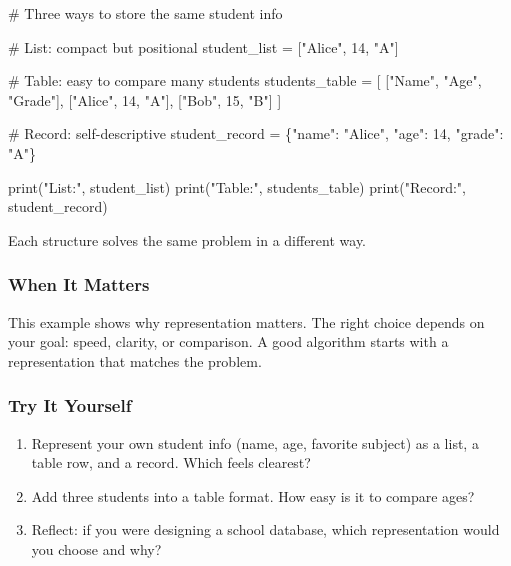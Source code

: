 \documentclass[
  letterpaper,
  DIV=11,
  numbers=noendperiod]{scrreprt}
\newenvironment{Shaded}{\begin{snugshade}}{\end{snugshade}}
\newcommand{\BuiltInTok}[1]{\textcolor[rgb]{0.00,0.23,0.31}{#1}}
\newcommand{\CommentTok}[1]{\textcolor[rgb]{0.37,0.37,0.37}{#1}}
\newcommand{\DecValTok}[1]{\textcolor[rgb]{0.68,0.00,0.00}{#1}}
\newcommand{\NormalTok}[1]{\textcolor[rgb]{0.00,0.23,0.31}{#1}}
\newcommand{\OperatorTok}[1]{\textcolor[rgb]{0.37,0.37,0.37}{#1}}
\newcommand{\StringTok}[1]{\textcolor[rgb]{0.13,0.47,0.30}{#1}}
\providecommand{\tightlist}{%
  \setlength{\itemsep}{0pt}\setlength{\parskip}{0pt}}
\begin{document}
\begin{Shaded}
\begin{Highlighting}[]
\CommentTok{\# Three ways to store the same student info}

\CommentTok{\# List: compact but positional}
\NormalTok{student\_list }\OperatorTok{=}\NormalTok{ [}\StringTok{"Alice"}\NormalTok{, }\DecValTok{14}\NormalTok{, }\StringTok{"A"}\NormalTok{]}

\CommentTok{\# Table: easy to compare many students}
\NormalTok{students\_table }\OperatorTok{=}\NormalTok{ [}
\NormalTok{    [}\StringTok{"Name"}\NormalTok{, }\StringTok{"Age"}\NormalTok{, }\StringTok{"Grade"}\NormalTok{],}
\NormalTok{    [}\StringTok{"Alice"}\NormalTok{, }\DecValTok{14}\NormalTok{, }\StringTok{"A"}\NormalTok{],}
\NormalTok{    [}\StringTok{"Bob"}\NormalTok{, }\DecValTok{15}\NormalTok{, }\StringTok{"B"}\NormalTok{]}
\NormalTok{]}

\CommentTok{\# Record: self{-}descriptive}
\NormalTok{student\_record }\OperatorTok{=}\NormalTok{ \{}\StringTok{"name"}\NormalTok{: }\StringTok{"Alice"}\NormalTok{, }\StringTok{"age"}\NormalTok{: }\DecValTok{14}\NormalTok{, }\StringTok{"grade"}\NormalTok{: }\StringTok{"A"}\NormalTok{\}}

\BuiltInTok{print}\NormalTok{(}\StringTok{"List:"}\NormalTok{, student\_list)}
\BuiltInTok{print}\NormalTok{(}\StringTok{"Table:"}\NormalTok{, students\_table)}
\BuiltInTok{print}\NormalTok{(}\StringTok{"Record:"}\NormalTok{, student\_record)}
\end{Highlighting}
\end{Shaded}

Each structure solves the same problem in a different way.

\subsubsection{When It Matters}\label{when-it-matters-57}

This example shows why representation matters. The right choice depends
on your goal: speed, clarity, or comparison. A good algorithm starts
with a representation that matches the problem.

\subsubsection{Try It Yourself}\label{try-it-yourself-59}

\begin{enumerate}
\def\labelenumi{\arabic{enumi}.}
\tightlist
\item
  Represent your own student info (name, age, favorite subject) as a
  list, a table row, and a record. Which feels clearest?
\item
  Add three students into a table format. How easy is it to compare
  ages?
\item
  Reflect: if you were designing a school database, which representation
  would you choose and why?
\end{enumerate}
\end{document}
